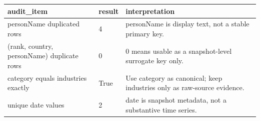 \begin{tabular}{lll}
\toprule
audit\_item & result & interpretation \\
\midrule
personName duplicated rows & 4 & personName is display text, not a stable primary key. \\
(rank, country, personName) duplicate rows & 0 & 0 means usable as a snapshot-level surrogate key only. \\
category equals industries exactly & True & Use category as canonical; keep industries only as raw-source evidence. \\
unique date values & 2 & date is snapshot metadata, not a substantive time series. \\
\bottomrule
\end{tabular}
